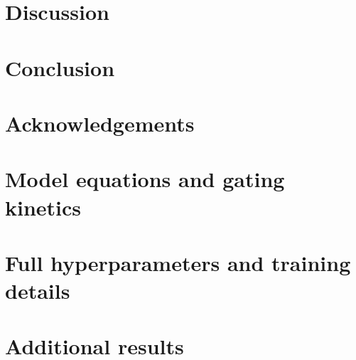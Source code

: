 \documentclass{article}
\begin{document}
\section{Discussion}
\label{sec:discussion}

\section{Conclusion}
\label{sec:conclusion}

\section*{Acknowledgements}



\appendix
\section{Model equations and gating kinetics}

\section{Full hyperparameters and training details}

\section{Additional results}
\end{document}
